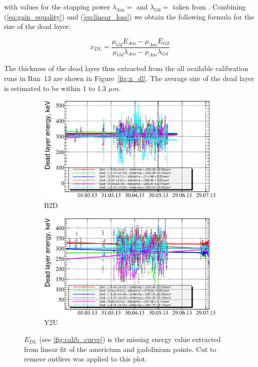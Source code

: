 \documentclass[a4paper,12pt]{article}
\begin{document}
\noindent
with values for the stopping power $\lambda_\text{Am} = $ and $\lambda_\text{Gd}
= $ taken from \cite{ASTAR_database}. Combining (\ref{eq:gain_equality}) and
(\ref{eq:linear_loss}) we obtain the following formula for the size of the dead
layer:

\begin{equation}
x_{DL} = \frac{\mu_{Gd} E_{Am} - \mu_{Am} E_{Gd}}{\mu_{Gd}\lambda_{Am} - \mu_{Am}\lambda_{Gd}}
\label{eq:x_dl}
\end{equation}

The thickness of the dead layer thus extracted from the all available
calibration runs in Run~13 are shown in Figure~\ref{fig:x_dl}. The average size
of the dead layer is estimated to be within 1 to 1.3 $\mu m$.

\newcommand\edllabellabel{$E_{DL}$ (see \ref{fig:calib_curve}) is the missing 
energy value extracted from linear fit of the americium and gadolinium points.
Cut to remove outliers was applied to this plot.}
\begin{figure}[p]
\begin{subfigure}[b]{0.5\textwidth}
\includegraphics[width=\textwidth]{gfx/run13_alpha_study/B2D/c_chDeadLayerEnergy_by_day_B2D.eps}
\caption{B2D}
\end{subfigure}
%
\begin{subfigure}[b]{0.5\textwidth}
\includegraphics[width=\textwidth]{gfx/run13_alpha_study/Y2U/c_chDeadLayerEnergy_by_day_Y2U.eps}
\caption{Y2U}
\end{subfigure}
%
\caption{\edllabellabel}
\label{fig:e_dl}
\end{figure}
\end{document}
